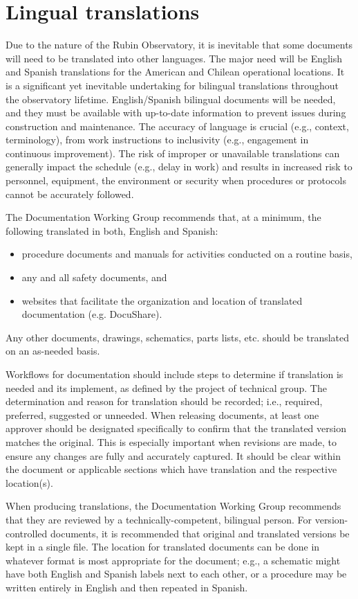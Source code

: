 \section{Lingual translations}

Due to the nature of the Rubin Observatory, it is inevitable that some documents will need to be translated into other languages.
The major need will be English and Spanish translations for the American and Chilean operational locations.
It is a significant yet inevitable undertaking for bilingual translations throughout the observatory lifetime.
English/Spanish bilingual documents will be needed, and they must be available with up-to-date information to prevent issues during construction and maintenance.
The accuracy of language is crucial (e.g., context, terminology), from work instructions to inclusivity (e.g., engagement in continuous improvement).
The risk of improper or unavailable translations can generally impact the schedule (e.g., delay in work) and results in increased risk to personnel, equipment, the environment or security when procedures or protocols cannot be accurately followed.

The Documentation Working Group recommends that, at a minimum, the following translated in both, English and Spanish:
\begin{itemize}
	\item procedure documents and manuals for activities conducted on a routine basis,
	\item any and all safety documents, and
	\item websites that facilitate the organization and location of translated documentation (e.g. DocuShare).
\end{itemize}
Any other documents, drawings, schematics, parts lists, etc. should be translated on an as-needed basis.

Workflows for documentation should include steps to determine if translation is needed and its implement, as defined by the project of technical group.
The determination and reason for translation should be recorded; i.e., required, preferred, suggested or unneeded.
When releasing documents, at least one approver should be designated specifically to confirm that the translated version matches the original.
This is especially important when revisions are made, to ensure any changes are fully and accurately captured.
It should be clear within the document or applicable sections which have translation and the respective location(s).

When producing translations, the Documentation Working Group recommends that they are reviewed by a technically-competent, bilingual person.
For version-controlled documents, it is recommended that original and translated versions be kept in a single file.
The location for translated documents can be done in whatever format is most appropriate for the document; e.g., a schematic might have both English and Spanish labels next to each other, or a procedure may be written entirely in English and then repeated in Spanish.

